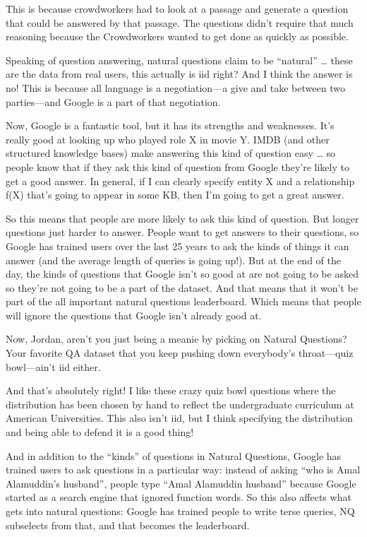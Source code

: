 This is because crowdworkers had to look at a passage and generate a question that could be answered by that passage.  The questions didn’t require that much reasoning because the Crowdworkers wanted to get done as quickly as possible.

Speaking of question answering, natural questions claim to be “natural” … these are the data from real users, this actually is iid right?  And I think the answer is no!  This is because all language is a negotiation—a give and take between two parties—and Google is a part of that negotiation. 

Now, Google is a fantastic tool, but it has its strengths and weaknesses.  It’s really good at looking up who played role X in movie Y.  IMDB (and other structured knowledge bases) make answering this kind of question easy … so people know that if they ask this kind of question from Google they’re likely to get a good answer.  In general, if I can clearly specify entity X and a relationship f(X) that’s going to appear in some KB, then I’m going to get a great answer.

So this means that people are more likely to ask this kind of question.  But longer questions just harder to answer.  People want to get answers to their questions, so Google has trained users over the last 25 years to ask the kinds of things it can answer (and the average length of queries is going up!).  But at the end of the day, the kinds of questions that Google isn’t so good at are not going to be asked so they’re not going to be a part of the dataset.  And that means that it won’t be part of the all important natural questions leaderboard.  Which means that people will ignore the questions that Google isn’t already good at.

Now, Jordan, aren’t you just being a meanie by picking on Natural Questions?  Your favorite QA dataset that you keep pushing down everybody’s throat—quiz bowl—ain’t iid either.  

And that’s absolutely right!  I like these crazy quiz bowl questions where the distribution has been chosen by hand to reflect the undergraduate curriculum at American Universities.  This also isn’t iid, but I think specifying the distribution and being able to defend it is a good thing!

And in addition to the “kinds” of questions in Natural Questions, Google has trained users to ask questions in a particular way: instead of asking “who is Amal Alamuddin’s husband”, people type “Amal Alamuddin husband” because Google started as a search engine that ignored function words.  So this also affects what gets into natural questions: Google has trained people to write terse queries, NQ subselects from that, and that becomes the leaderboard.

